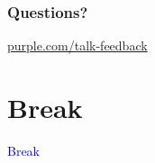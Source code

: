 \documentclass[t]{beamer}
\newcommand\blue[1]{\textcolor{blue}{#1}}
\newcommand\talksection[1]{\section{#1}
\begin{frame}
  \vfill\Huge\bf\blue{\centerline{#1}}
\end{frame}
}
\begin{document}
\begin{frame}
  \frametitle{}

  \note{

  }

\end{frame}

\begin{frame}
  \frametitle{}

  \note{

  }

\end{frame}

\begin{frame}
  \frametitle{}

  \note{

  }

\end{frame}

\begin{frame}
  \frametitle{}

  \note{

  }

\end{frame}

\begin{frame}
  \frametitle{}

  \note{

  }

\end{frame}

\begin{frame}
  \frametitle{}

  \note{

  }

\end{frame}

\begin{frame}
  \frametitle{}

  \note{

  }

\end{frame}

\begin{frame}
  \frametitle{}

  \note{

  }

\end{frame}

\begin{frame}
  \frametitle{Questions?}
  \vspace{3cm}
  \centerline{\large\url{purple.com/talk-feedback}}
\end{frame}

\talksection{Break}
\end{document}
